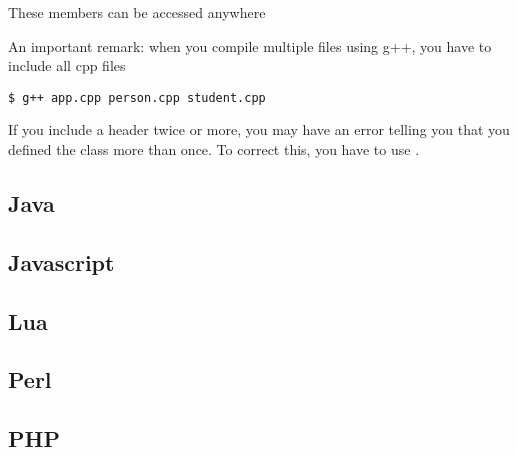 \documentclass{KodeBook}
\begin{document}
These members can be accessed anywhere



An important remark: when you compile multiple files using g++, you have to include all cpp files
\begin{lstlisting}[style=shellStyle]
$ g++ app.cpp person.cpp student.cpp
\end{lstlisting}

If you include a header twice or more, you may have an error telling you that you defined the class more than once. 
To correct this, you have to use .





\subsection{Java}

%

\subsection{Javascript} 

%
%
%


\subsection{Lua}


\subsection{Perl}

%

\subsection{PHP}
\end{document}
